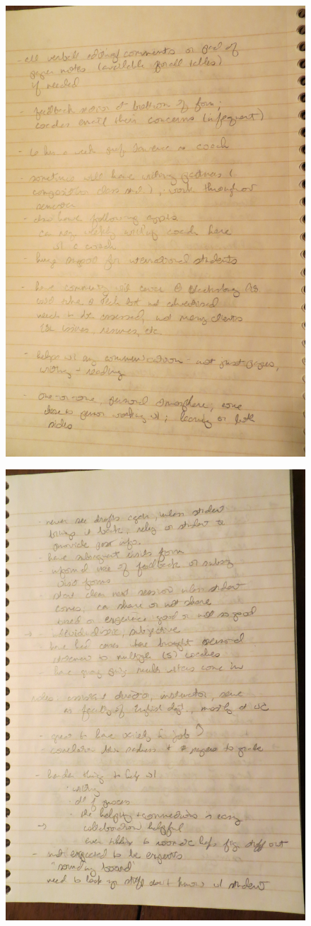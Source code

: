 \documentclass[12pt]{article} %
\begin{document}
  \begin{figure}[H]
  \centering
  \includegraphics[width=0.75\linewidth]{RAZ_raw_notes4}
  \caption{}
  \label{fig:rn4}
  \end{figure}
  \begin{figure}[H]
  \centering
  \includegraphics[width=0.75\linewidth]{RAZ_raw_notes5}
  \caption{}
  \label{fig:rn5}
  \end{figure}
\end{document}
